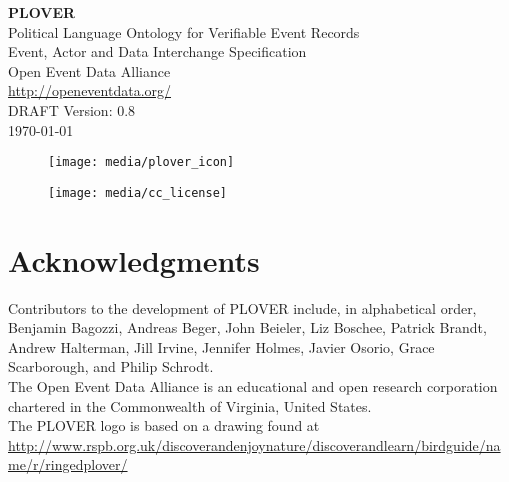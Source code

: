 \documentclass[11pt]{report}
\begin{document}

\vspace{-10pt}	

      \begin{center}
            {\Huge \bfseries PLOVER\ }\\[2ex] 
            {\LARGE Political Language Ontology for Verifiable Event Records\\ [2ex]Event, Actor and Data Interchange Specification}\\[10ex] 
            {\LARGE Open Event Data Alliance} \\[2ex] 
            {\Large \url{http://openeventdata.org/} }\\[2ex] 
            {\LARGE DRAFT Version: 0.8\\ [2EX]\monthyeardate\today}
        \end{center}


\begin{figure}[h!]
\centering
\texttt{[image: media/plover\_icon]}
\end{figure}

\vspace{20pt}	


\begin{figure}[h!]
\centering
\texttt{[image: media/cc\_license]}
\end{figure}






\chapter*{Acknowledgments}

\noindent Contributors to the development of PLOVER include, in alphabetical order, Benjamin Bagozzi, Andreas Beger, John Beieler, Liz Boschee, Patrick Brandt, Andrew Halterman, Jill Irvine, Jennifer Holmes, Javier Osorio, Grace Scarborough, and Philip Schrodt.\\

\noindent The Open Event Data Alliance is an educational and open research corporation chartered in the Commonwealth of Virginia, United States.\\

\noindent The PLOVER logo is based on a drawing found at\\ \url{http://www.rspb.org.uk/discoverandenjoynature/discoverandlearn/birdguide/name/r/ringedplover/}\\
\end{document}
